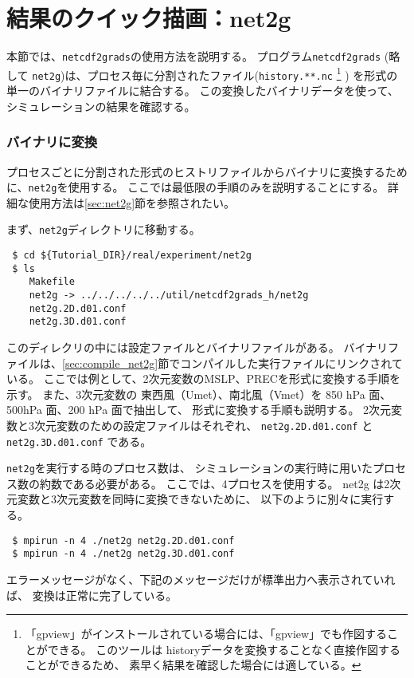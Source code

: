 \section{結果のクイック描画：net2g} \label{sec:quicklook}

本節では、\verb|netcdf2grads|の使用方法を説明する。
プログラム\verb|netcdf2grads| (略して \verb|net2g|)は、プロセス毎に分割された{\netcdf}ファイル(\verb|history.**.nc|
\footnote{「gpview」がインストールされている場合には、「gpview」でも作図することができる。
このツールは historyデータを変換することなく直接作図することができるため、
素早く結果を確認した場合には適している。
}
)
を{\grads}形式の単一のバイナリファイルに結合する。
この変換した{\grads}バイナリデータを使って、シミュレーションの結果を確認する。


\subsubsection{{\grads}バイナリに変換}
プロセスごとに分割された{\netcdf}形式のヒストリファイルから{\grads}バイナリに変換するために、\verb|net2g|を使用する。
ここでは最低限の手順のみを説明することにする。
詳細な使用方法は\ref{sec:net2g}節を参照されたい。

まず、\verb|net2g|ディレクトリに移動する。
\begin{verbatim}
 $ cd ${Tutorial_DIR}/real/experiment/net2g
 $ ls
    Makefile
    net2g -> ../../../../../util/netcdf2grads_h/net2g
    net2g.2D.d01.conf
    net2g.3D.d01.conf
\end{verbatim}
このディレクリの中には設定ファイルとバイナリファイルがある。
バイナリファイルは、\ref{sec:compile_net2g}節でコンパイルした実行ファイルにリンクされている。
ここでは例として、2次元変数のMSLP、PRECを{\grads}形式に変換する手順を示す。
また、3次元変数の 東西風（Umet）、南北風（Vmet）を 850 hPa 面、500hPa 面、200 hPa 面で抽出して、
{\grads}形式に変換する手順も説明する。
2次元変数と3次元変数のための設定ファイルはそれぞれ、
\verb|net2g.2D.d01.conf| と \verb|net2g.3D.d01.conf| である。

\verb|net2g|を実行する時のプロセス数は、
シミュレーションの実行時に用いたプロセス数の約数である必要がある。
ここでは、4プロセスを使用する。
net2g は2次元変数と3次元変数を同時に変換できないために、
以下のように別々に実行する。
\begin{verbatim}
 $ mpirun -n 4 ./net2g net2g.2D.d01.conf
 $ mpirun -n 4 ./net2g net2g.3D.d01.conf
\end{verbatim}
エラーメッセージがなく、下記のメッセージだけが標準出力へ表示されていれば、
変換は正常に完了している。\\

